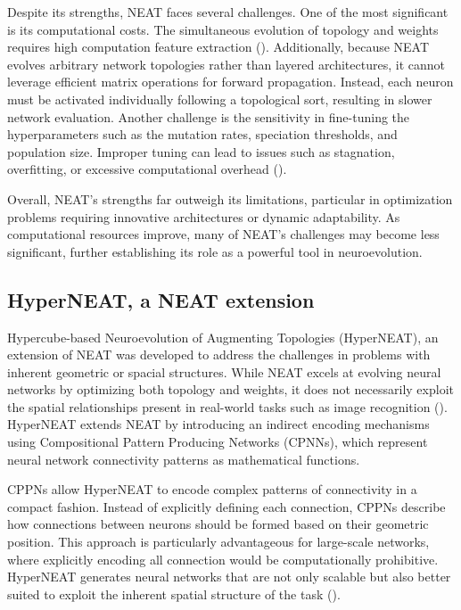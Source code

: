 \noindent Despite its strengths, NEAT faces several challenges. One of the most significant is its computational costs. The simultaneous evolution of topology and weights requires high computation feature extraction (\cite{peng2018neat}). Additionally, because NEAT evolves arbitrary network topologies rather than layered architectures, it cannot leverage efficient matrix operations for forward propagation. Instead, each neuron must be activated individually following a topological sort, resulting in slower network evaluation. Another challenge is the sensitivity in fine-tuning the hyperparameters such as the mutation rates, speciation thresholds, and population size. Improper tuning can lead to issues such as stagnation, overfitting, or excessive computational overhead (\cite{stanley2002evolving}). \bigskip

\noindent Overall, NEAT's strengths far outweigh its limitations, particular in optimization problems requiring innovative architectures or dynamic adaptability. As computational resources improve, many of NEAT's challenges may become less significant, further establishing its role as a powerful tool in neuroevolution.

\subsection{HyperNEAT, a NEAT extension}
Hypercube-based Neuroevolution of Augmenting Topologies (HyperNEAT), an extension of NEAT was developed to address the challenges in problems with inherent geometric or spacial structures. While NEAT excels at evolving neural networks by optimizing both topology and weights, it does not necessarily exploit the spatial relationships present in real-world tasks such as image recognition (\cite{stanley2009hypercube}). HyperNEAT extends NEAT by introducing an indirect encoding mechanisms using Compositional Pattern Producing Networks (CPNNs), which represent neural network connectivity patterns as mathematical functions. \bigskip

\noindent CPPNs allow HyperNEAT to encode complex patterns of connectivity in a compact fashion. Instead of explicitly defining each connection, CPPNs describe how connections between neurons should be formed based on their geometric position. This approach is particularly advantageous for large-scale networks, where explicitly encoding all connection would be computationally prohibitive. HyperNEAT generates neural networks that are not only scalable but also better suited to exploit the inherent spatial structure of the task (\cite{stanley2009hypercube}). \bigskip


